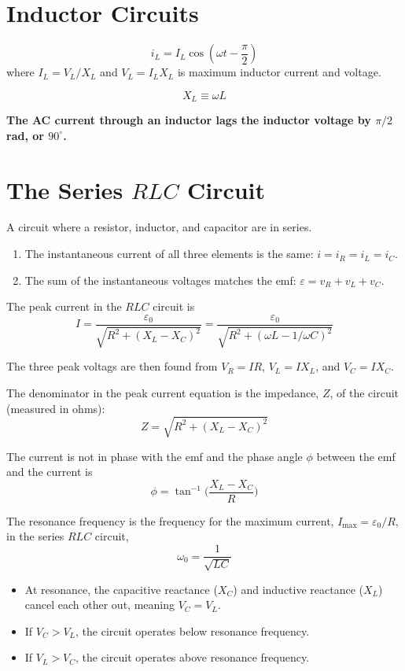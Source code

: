 \documentclass{article}
\begin{document}
\section*{Inductor Circuits}
\[i_L = I_L\cos(\omega t - \frac{\pi}{2})\]
where $I_L = V_L / X_L$ and $V_L = I_L X_L$ is maximum inductor current and voltage.

\[X_L\equiv \omega L\]

\textbf{The AC current through an inductor lags the inductor voltage by $\pi / 2$ rad, or
$90^\circ$.}

\pagebreak

\section*{The Series $RLC$ Circuit}
A circuit where a resistor, inductor, and capacitor are in series.
\begin{enumerate}
    \item The instantaneous current of all three elements is the same: $i=i_R = i_L = i_C$.
    \item The sum of the instantaneous voltages matches the emf: $\varepsilon = v_R + v_L + v_C$.
\end{enumerate}

The peak current in the $RLC$ circuit is
\[I=\frac{\varepsilon_0}{\sqrt{R^2 + {(X_L - X_C)}^2}} = \frac{\varepsilon_0}{\sqrt{R^2 + {(\omega
L - 1 / \omega C)}^2}}\]

The three peak voltags are then found from $V_R = IR$, $V_L = IX_L$, and $V_C = IX_C$.
\vspace{1em}

The denominator in the peak current equation is the impedance, $Z$, of the circuit (measured in
ohms):
\[Z=\sqrt{R^2 + {(X_L - X_C)}^2}\]

The current is not in phase with the emf and the phase angle $\phi$ between the emf and the current
is
\[\phi = \tan^{-1}\Bigg(\frac{X_L - X_C}{R}\Bigg)\]

The resonance frequency is the frequency for the maximum current,
$I_\text{max} = \varepsilon_0 / R$, in the series $RLC$ circuit,
\[\omega_0 = \frac{1}{\sqrt{LC}}\]

\begin{itemize}
    \item At resonance, the capacitive reactance ($X_C$) and inductive reactance ($X_L$) cancel
    each other out, meaning $V_C=V_L$.
    \item If $V_C > V_L$, the circuit operates below resonance frequency.
    \item If $V_L > V_C$, the circuit operates above resonance frequency.
\end{itemize}
\end{document}
